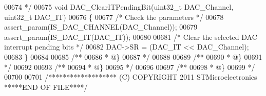 \begin{DoxyCode}
00674 \textcolor{comment}{  */}
00675 \textcolor{keywordtype}{void} DAC_ClearITPendingBit(uint32\_t DAC\_Channel, uint32\_t DAC\_IT)
00676 \{
00677   \textcolor{comment}{/* Check the parameters */}
00678   assert_param(IS\_DAC\_CHANNEL(DAC\_Channel));
00679   assert_param(IS\_DAC\_IT(DAC\_IT));
00680 
00681   \textcolor{comment}{/* Clear the selected DAC interrupt pending bits */}
00682   DAC->SR = (DAC\_IT << DAC\_Channel);
00683 \}
00684 
00685 \textcolor{comment}{/**}
00686 \textcolor{comment}{  * @\}}
00687 \textcolor{comment}{  */}
00688 
00689 \textcolor{comment}{/**}
00690 \textcolor{comment}{  * @\}}
00691 \textcolor{comment}{  */}
00692 
00693 \textcolor{comment}{/**}
00694 \textcolor{comment}{  * @\}}
00695 \textcolor{comment}{  */}
00696 
00697 \textcolor{comment}{/**}
00698 \textcolor{comment}{  * @\}}
00699 \textcolor{comment}{  */}
00700 
00701 \textcolor{comment}{/******************* (C) COPYRIGHT 2011 STMicroelectronics *****END OF FILE****/}
\end{DoxyCode}
